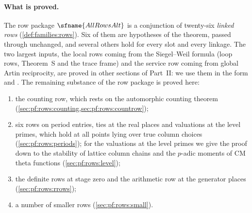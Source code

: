 \paragraph{What is proved.}
The row package $\sfname{AllRowsAlt}$ is a conjunction of twenty-six \emph{linked rows} (\cref{def:families:rows}).
Six of them are hypotheses of the theorem, passed through unchanged, and several others hold for every slot and
every linkage. The two largest inputs, the local rows coming from the Siegel--Weil formula (loop rows, Theorem~S and
the trace frame) and the service row coming from global Artin reciprocity, are proved in other sections of Part~II:
we use them in the form  and .
The remaining substance of the row package is proved here:
\begin{enumerate}[label=(\alph*)]
\item the counting row, which rests on the automorphic counting theorem (\cref{sec:pf:rows:counting,sec:pf:rows:countrow});
\item six rows on period entries, ties at the real places and valuations at the level primes, which hold at all
points lying over true column choices (\cref{sec:pf:rows:periods}); for the valuations at the level primes we give the proof
down to the stability of lattice column chains and the $p$-adic moments of CM theta functions (\cref{sec:pf:rows:level});
\item the definite rows at stage zero and the arithmetic row at the generator places (\cref{sec:pf:rows:rrows});
\item a number of smaller rows (\cref{sec:pf:rows:small}).
\end{enumerate}

